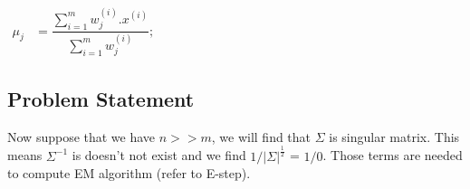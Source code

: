 \documentclass[12pt]{article}
\begin{document}
$\begin{aligned}
    \mu_{j}&=\dfrac{\sum_{i=1}^{m} w_{j}^{(i)} . x^{(i)}}{\sum_{i=1}^{m} w_{j}^{(i)}};
\end{aligned}$ 

\subsection{Problem Statement} 
Now suppose that we have $n>>m$, we will find that $\Sigma$ is singular matrix. This means $\Sigma^{-1}$ is doesn't not exist and we find ${1}/{|\Sigma|^{\frac{1}{2}}}$  = $1/0$. Those terms are needed to compute EM algorithm (refer to E-step).
\end{document}
